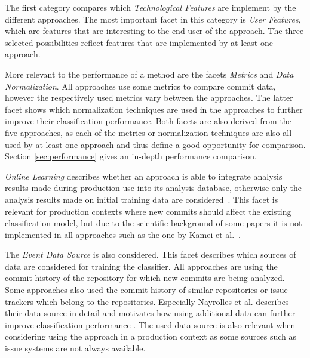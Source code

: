 The first category compares which \textit{Technological Features} are implement by the different approaches. The most important facet in this category is \textit{User Features}, which are features that are interesting to the end user of the approach. The three selected possibilities reflect features that are implemented by at least one approach.

More relevant to the performance of a method are the facets \textit{Metrics} and \textit{Data Normalization}. All approaches use some metrics to compare commit data, however the respectively used metrics vary between the approaches.
The latter facet shows which normalization techniques are used in the approaches to further improve their classification performance.
Both facets are also derived from the five approaches, as each of the metrics or normalization techniques are also all used by at least one approach and thus define a good opportunity for comparison. Section \ref{sec:performance} gives an in-depth performance comparison.%

\textit{Online Learning} describes whether an approach is able to integrate analysis results made during production use into its analysis database, otherwise only the analysis results made on initial training data are considered~\cite{MAL-018}. This facet is relevant for production contexts where new commits should affect the existing classification model, but due to the scientific background of some papers it is not implemented in all approaches such as the one by Kamei et al.~\cite{Yang2015}.

The \textit{Event Data Source} is also considered. This facet describes which sources of data are considered for training the classifier. All approaches are using the commit history of the repository for which new commits are being analyzed. Some approaches also used the commit history of similar repositories or issue trackers which belong to the repositories.
Especially Nayrolles et al. describes their data source in detail and motivates how using additional data can further improve classification performance \cite{Nayrolles2018}. The used data source is also relevant when considering using the approach in a production context as some sources such as issue systems are not always available. 

